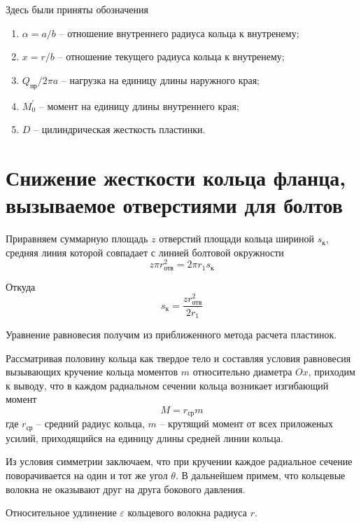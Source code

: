 Здесь были приняты обозначения 
\begin{enumerate}
  \item $\alpha=a/b$ -- отношение внутреннего радиуса кольца к внутренему;
  \item $x=r/b$ -- отношение текущего радиуса кольца к внутренему;
  \item $Q_{\text{пр}}/2 \pi a$ -- нагрузка на единицу длины наружного края;
  \item $M_0^{\prime}$ -- момент на единицу длины внутреннего края;
  \item $D$ -- цилиндрическая жесткость пластинки.
  \end{enumerate}


\section{Снижение жесткости кольца фланца, вызываемое отверстиями для болтов}
\label{RingStiff}

Приравняем суммарную площадь $z$ отверстий площади кольца шириной $s_{\text{к}}$, средняя линия которой совпадает с линией болтовой окружности 
\begin{equation}
  \label{RingStiff_eq1}
  z \pi r_{\text{отв}}^{2} = 2 \pi r_{1} s_{\text{к}} 
\end{equation}

Откуда 
\begin{equation}
\label{s_k}
  s_{\text{к}}=\frac{zr_{\text{отв}}^{2}}{2r_{1}}
\end{equation}

Уравнение равновесия получим из приближенного метода расчета пластинок.

Рассматривая половину кольца как твердое тело и составляя условия равновесия вызывающих кручение кольца моментов $m$ относительно диаметра $Ox$, приходим к выводу, что в каждом радиальном сечении кольца возникает изгибающий момент 
\begin{equation}
  M = r_{\text{ср}}m
\end{equation}
где $r_{\text{ср}}$ -- средний радиус кольца, $m$ -- крутящий момент от всех приложеных усилий, приходящийся на единицу длины средней линии кольца. 

Из условия симметрии заключаем, что при кручении каждое радиальное сечение поворачивается на один и тот же угол $\theta$. В дальнейшем примем, что кольцевые волокна не оказывают друг на друга бокового давления.

Относительное удлинение $\varepsilon$ кольцевого волокна радиуса $r$.

